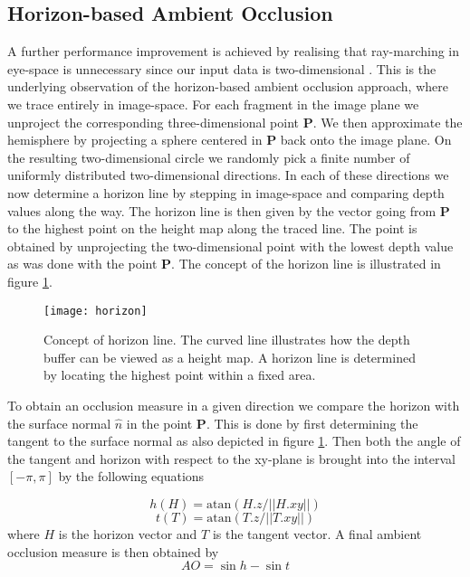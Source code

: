 \subsection{Horizon-based Ambient Occlusion}
\label{sec:hbao}
A further performance improvement is achieved by realising that
ray-marching in eye-space is unnecessary since our input data is
two-dimensional \citep{hbao}. This is the underlying observation of
the horizon-based ambient occlusion approach, where we trace entirely
in image-space. For each fragment in the image plane we unproject the
corresponding three-dimensional point $\mathbf{P}$. We then approximate the hemisphere by
projecting a sphere centered in $\mathbf{P}$ back onto the image
plane. On the resulting two-dimensional circle we randomly pick a
finite number of uniformly distributed two-dimensional directions. In
each of these directions we now determine a horizon line by stepping
in image-space and comparing depth values along the way. The horizon
line is then given by the vector going from $\mathbf{P}$ to the
highest point on the height map along the traced line. The point is
obtained by unprojecting the two-dimensional point with the lowest
depth value as was done with the point $\mathbf{P}$. The concept of
the horizon line is illustrated in figure \ref{fig:horizon}.
\begin{figure}[h]
  \label{fig:horizon}
  \centering
  \texttt{[image: horizon]}
  \caption{Concept of horizon line. The curved line illustrates how
    the depth buffer can be viewed as a height map. A horizon line is
    determined by locating the highest point within a fixed area.}
\end{figure}
To obtain an occlusion measure in a given direction we compare
the horizon with the surface normal $\hat{n}$ in the point
$\mathbf{P}$. This is done by first determining the tangent to the
surface normal as also depicted in figure \ref{fig:horizon}. Then both
the angle of the tangent and horizon with respect to the xy-plane is
brought into the interval $[-\pi,\pi]$ by the following equations

\begin{displaymath}
  h(H)=\textrm{atan} (H.z / ||H.xy||)
\end{displaymath}
\begin{displaymath}
  t(T)=\textrm{atan} (T.z / ||T.xy||)
\end{displaymath}
where $H$ is the horizon vector and $T$ is the tangent vector. A final
ambient occlusion measure is then obtained by
\begin{displaymath}
  AO = \sin h - \sin t
\end{displaymath}


